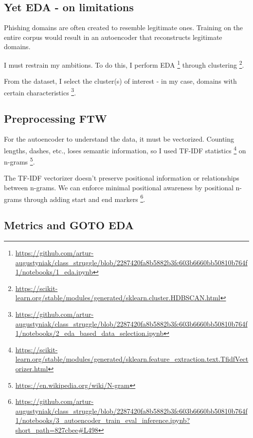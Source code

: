 \documentclass[twocolumn,9pt]{extarticle}
\begin{document}
\vspace{-9pt}
\subsection*{Yet EDA - on limitations}
\vspace{-6pt}
Phishing domains are often created to resemble legitimate ones. 
Training on the entire corpus would result in an autoencoder that reconstructs legitimate domains.

I must restrain my ambitions. 
To do this, I perform EDA \footnote{\url{https://github.com/artur-augustyniak/class_struggle/blob/2287420fa8b5882b3fc603b6660bb50810b764f1/notebooks/1_eda.ipynb}} through clustering \footnote{\url{https://scikit-learn.org/stable/modules/generated/sklearn.cluster.HDBSCAN.html}}.

From the dataset, I select the cluster(s) of interest - in my case, domains with certain characteristics \footnote{\url{https://github.com/artur-augustyniak/class_struggle/blob/2287420fa8b5882b3fc603b6660bb50810b764f1/notebooks/2_eda_based_data_selection.ipynb}}.

\vspace{-9pt}
\subsection*{Preprocessing FTW}
\vspace{-6pt}
For the autoencoder to understand the data, it must be vectorized. 
Counting lengths, dashes, etc., loses semantic information, so I used TF-IDF statistics \footnote{\url{https://scikit-learn.org/stable/modules/generated/sklearn.feature_extraction.text.TfidfVectorizer.html}} on n-grams \footnote{\url{https://en.wikipedia.org/wiki/N-gram}}.

The TF-IDF vectorizer doesn’t preserve positional information or relationships between n-grams.
We can enforce minimal positional awareness by positional n-grams through adding start and end markers \footnote{\url{https://github.com/artur-augustyniak/class_struggle/blob/2287420fa8b5882b3fc603b6660bb50810b764f1/notebooks/3_autoencoder_train_eval_inference.ipynb?short_path=827cbee\#L498}}.


\vspace{-9pt}
\subsection*{Metrics and GOTO EDA}
\vspace{-6pt}
\end{document}
